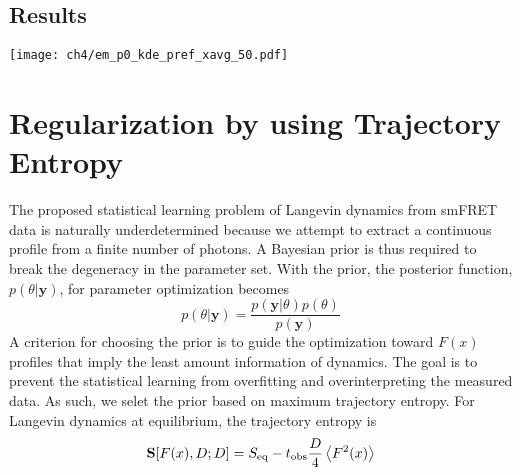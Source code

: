 \subsection{Results}
\begin{center}
    \texttt{[image: ch4/em\_p0\_kde\_pref\_xavg\_50.pdf]} 
\end{center}

\section{Regularization by using Trajectory Entropy}
The proposed statistical learning problem of Langevin dynamics from smFRET data is naturally underdetermined because we attempt to extract a continuous profile from a finite number of photons. A Bayesian prior is thus required to break the degeneracy in the parameter set. With the prior, the posterior function, $p(\theta | \textbf{y})$, for parameter optimization becomes
\begin{equation}
    p(\theta | \textbf{y}) = \frac{p(\textbf{y}|\theta) p(\theta)}{p(\textbf{y})}
\end{equation}
A criterion for choosing the prior is to guide the optimization toward $F(x)$ profiles that imply the least amount information of dynamics. The goal is to prevent the statistical learning from overfitting and overinterpreting the measured data. As such, we selet the prior based on maximum trajectory entropy. For Langevin dynamics at equilibrium, the trajectory entropy is 
\begin{equation}
    \textbf{S}[F(x), D; D] = S_{\rm eq} - t_{\rm obs} \frac{D}{4}\left< F^2(x)\right>
\end{equation}
